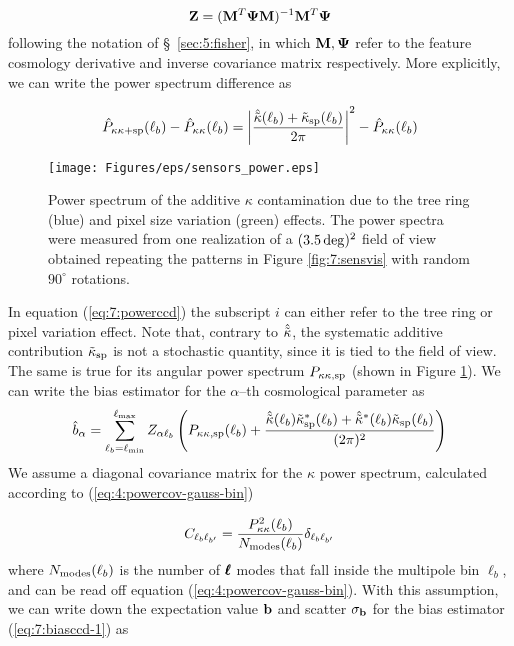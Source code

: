 \begin{equation}
\label{eq:7:zeta}
\mathbf{Z} = (\mathbf{M}^T\mathbf{\Psi}\mathbf{M})^{-1}\mathbf{M}^T\mathbf{\Psi}
\end{equation}
%
following the notation of \S~\ref{sec:5:fisher}, in which $\mathbf{M},\mathbf{\Psi}$ refer to the feature cosmology derivative and inverse covariance matrix respectively. More explicitly, we can write the power spectrum difference as 

\begin{equation}
\label{eq:7:powerccd}
\hat{P}_{\kappa\kappa+{\rm sp}}(\ell_b)-\hat{P}_{\kappa\kappa}(\ell_b) = \left\vert\frac{\hat{\tilde{\kappa}}(\ell_b)+\tilde{\kappa}_{\rm sp}(\ell_b)}{2\pi}\right\vert^2-\hat{P}_{\kappa\kappa}(\ell_b) 
\end{equation} 
%
\begin{figure}
\begin{center}
\texttt{[image: Figures/eps/sensors\_power.eps]}
\end{center}
\caption{Power spectrum of the additive $\kappa$ contamination due to the tree ring (blue) and pixel size variation (green) effects. The power spectra were measured from one realization of a $(3.5\,{\rm deg})^2$ field of view obtained repeating the patterns in Figure \ref{fig:7:sensvis} with random $90^\circ$ rotations.}
\label{fig:7:ccdpow}
\end{figure}
%
In equation (\ref{eq:7:powerccd}) the subscript $i$ can either refer to the tree ring or pixel variation effect. Note that, contrary to $\hat{\tilde{\kappa}}$, the systematic additive contribution $\tilde{\kappa}_{\rm sp}$ is not a stochastic quantity, since it is tied to the field of view. The same is true for its angular power spectrum $P_{\kappa\kappa,{\rm sp}}$ (shown in Figure \ref{fig:7:ccdpow}). We can write the bias estimator for the $\alpha$--th cosmological parameter as 
\begin{equation}
\label{eq:7:biasccd-1}
\hat{b}_\alpha = \sum_{\ell_b=\ell_{\rm min}}^{\ell_{\rm max}} Z_{\alpha\ell_b}\left(P_{\kappa\kappa,{\rm sp}}(\ell_b)+\frac{\hat{\tilde{\kappa}}(\ell_b)\tilde{\kappa}_{\rm sp}^*(\ell_b)+\hat{\tilde{\kappa}}^*(\ell_b)\tilde{\kappa}_{\rm sp}(\ell_b)}{(2\pi)^2}\right)
\end{equation}
%
We assume a diagonal covariance matrix for the $\kappa$ power spectrum, calculated according to (\ref{eq:4:powercov-gauss-bin}) 

\begin{equation}
\label{eq:7:diagcov}
C_{\ell_b\ell_{b'}} = \frac{P^2_{\kappa\kappa}(\ell_b)}{N_{\rm modes}(\ell_b)}\delta_{\ell_b\ell_{b'}}
\end{equation}
%
where $N_{\rm modes}(\ell_b)$ is the number of $\pmb{\ell}$ modes that fall inside the multipole bin $\ell_b$, and can be read off equation (\ref{eq:4:powercov-gauss-bin}). With this assumption, we can write down the expectation value $\mathbf{b}$ and scatter $\sigma_{\mathbf{b}}$ for the bias estimator (\ref{eq:7:biasccd-1}) as  

